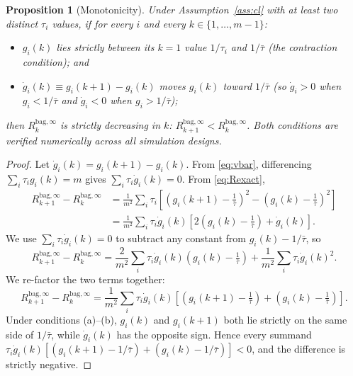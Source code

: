 \documentclass[12pt,a4paper]{article}
\newtheorem{proposition}{Proposition}
\theoremstyle{definition}
\newcommand{\Rk}{R_k^{\mathrm{bag},\infty}}
\begin{document}
\begin{proposition}[Monotonicity]\label{prop:mono}
Under Assumption~\ref{ass:cl} with at least two distinct $\tau_i$ values,
if for every $i$ and every $k\in\{1,\ldots,m-1\}$:
\begin{itemize}[nosep]
  \item[(a)] $g_i(k)$ lies strictly between its $k=1$ value $1/\tau_i$
    and $1/\bar\tau$ (the contraction condition); and
  \item[(b)] $\dot g_i(k)\equiv g_i(k+1)-g_i(k)$ moves $g_i(k)$ toward
    $1/\bar\tau$ (so $\dot g_i>0$ when $g_i<1/\bar\tau$ and
    $\dot g_i<0$ when $g_i>1/\bar\tau$);
\end{itemize}
then $\Rk$ is strictly decreasing in $k$: $R_{k+1}^{\mathrm{bag},\infty}<\Rk$.
Both conditions are verified numerically across all simulation designs.
\end{proposition}

\begin{proof}
Let $\dot g_i(k)=g_i(k+1)-g_i(k)$.  From \eqref{eq:vbar}, differencing
$\sum_i\tau_i g_i(k)=m$ gives $\sum_i\tau_i\dot g_i(k)=0$.
From \eqref{eq:Rexact},
\begin{align*}
R_{k+1}^{\mathrm{bag},\infty}-\Rk
  &= \frac{1}{m^2}\sum_i\tau_i
     \!\left[\!\left(g_i(k\!+\!1)-\tfrac{1}{\bar\tau}\right)^{\!2}
             -\!\left(g_i(k)-\tfrac{1}{\bar\tau}\right)^{\!2}\right]\\
  &= \frac{1}{m^2}\sum_i\tau_i\dot g_i(k)
     \!\left[2\!\left(g_i(k)-\tfrac{1}{\bar\tau}\right)+\dot g_i(k)\right].
\end{align*}
We use $\sum_i\tau_i\dot g_i(k)=0$ to subtract any constant from
$g_i(k)-1/\bar\tau$, so
\begin{equation*}
R_{k+1}^{\mathrm{bag},\infty}-\Rk
  = \frac{2}{m^2}\sum_i\tau_i\dot g_i(k)\!\left(g_i(k)-\tfrac{1}{\bar\tau}\right)
    +\frac{1}{m^2}\sum_i\tau_i\dot g_i(k)^2.
\end{equation*}
We re-factor the two terms together:
\begin{equation*}
R_{k+1}^{\mathrm{bag},\infty}-\Rk
  = \frac{1}{m^2}\sum_i\tau_i\dot g_i(k)
    \!\left[\!\left(g_i(k+1)-\tfrac{1}{\bar\tau}\right)
           +\!\left(g_i(k)-\tfrac{1}{\bar\tau}\right)\right].
\end{equation*}
Under conditions (a)--(b), $g_i(k)$ and $g_i(k+1)$ both lie strictly on
the same side of $1/\bar\tau$, while $\dot g_i(k)$ has the opposite sign.
Hence every summand $\tau_i\dot g_i(k)[(g_i(k+1)-1/\bar\tau)+(g_i(k)-1/\bar\tau)]<0$,
and the difference is strictly negative.
\end{proof}
\end{document}

